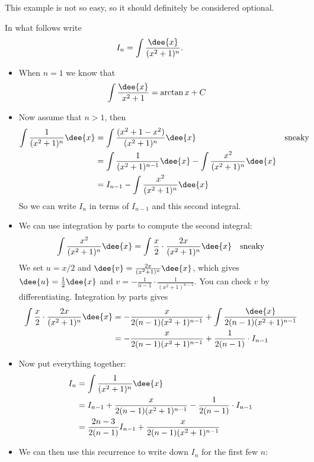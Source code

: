 \begin{eg}
This example is not so easy, so it should definitely be considered optional.

\soln In what follows write
\begin{align*}
  I_n &= \int \frac{\dee{x}}{(x^2+1)^n}.
\end{align*}
\begin{itemize}
 \item When $n=1$ we know that
\begin{align*}
  \int \frac{\dee{x}}{x^2+1} &= \arctan x +C
\end{align*}
 \item Now assume that $n>1$, then
\begin{align*}
  \int \frac{1}{(x^2+1)^n}\dee{x}
  &= \int \frac{(x^2+1-x^2)}{(x^2+1)^n}\dee{x} & \text{sneaky} \\
  &= \int \frac{1}{(x^2+1)^{n-1}}\dee{x} - \int \frac{x^2}{(x^2+1)^n}\dee{x}\\
  &= I_{n-1} - \int \frac{x^2}{(x^2+1)^n}\dee{x}
\end{align*}
So we can write $I_n$ in terms of $I_{n-1}$ and this second integral.
\item We can use integration by parts to compute the second integral:
\begin{align*}
  \int \frac{x^2}{(x^2+1)^n}\dee{x}
&= \int \frac{x}{2} \cdot \frac{2x}{(x^2+1)^n}\dee{x} & \text{sneaky}
\end{align*}
We set $u=x/2$ and $\dee{v}=\frac{2x}{(x^2+1)^n}\dee{x}$, which gives
$\dee{u}=\frac{1}{2}\dee{x}$ and $v=-\frac{1}{n-1} \cdot \frac{1}{(x^2+1)^{n-1}}$. You
can
check $v$ by differentiating. Integration by parts gives
\begin{align*}
  \int \frac{x}{2} \cdot \frac{2x}{(x^2+1)^n}\dee{x}
&= - \frac{x}{2(n-1)(x^2+1)^{n-1}} + \int \frac{\dee{x}}{2(n-1)(x^2+1)^{n-1}}\\
&= - \frac{x}{2(n-1)(x^2+1)^{n-1}} + \frac{1}{2(n-1)} \cdot I_{n-1}
\end{align*}
\item Now put everything together:
\begin{align*}
  I_n &= \int \frac{1}{(x^2+1)^n}\dee{x} \\
  &= I_{n-1} + \frac{x}{2(n-1)(x^2+1)^{n-1}} - \frac{1}{2(n-1)} \cdot I_{n-1} \\
  &= \frac{2n-3}{2(n-1)} I_{n-1} + \frac{x}{2(n-1)(x^2+1)^{n-1}}
\end{align*}
\item We can then use this recurrence to write down $I_n$ for the first few $n$:

\end{itemize}
\end{eg}

